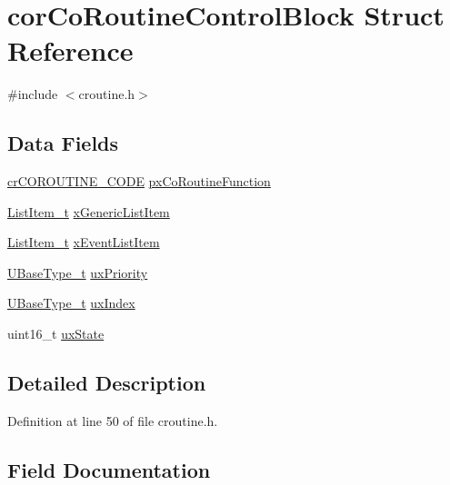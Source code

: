 \hypertarget{structcor_co_routine_control_block}{}\section{cor\+Co\+Routine\+Control\+Block Struct Reference}
\label{structcor_co_routine_control_block}


{\ttfamily \#include $<$croutine.\+h$>$}

\subsection*{Data Fields}
\begin{DoxyCompactItemize}
\item 
\hyperlink{croutine_8h_a397a7505718dd366d8411ce324c49758}{cr\+C\+O\+R\+O\+U\+T\+I\+N\+E\+\_\+\+C\+O\+DE} \hyperlink{structcor_co_routine_control_block_acc98c7364cd88e8e034a5f9bba113832}{px\+Co\+Routine\+Function}
\item 
\hyperlink{list_8h_a1a62d469392f9bfe2443e7efab9c8398}{List\+Item\+\_\+t} \hyperlink{structcor_co_routine_control_block_aa2900494db8782eeb8ef12d482501406}{x\+Generic\+List\+Item}
\item 
\hyperlink{list_8h_a1a62d469392f9bfe2443e7efab9c8398}{List\+Item\+\_\+t} \hyperlink{structcor_co_routine_control_block_a105d316da0069f766acc3b210afed1b9}{x\+Event\+List\+Item}
\item 
\hyperlink{portmacro_8h_a646f89d4298e4f5afd522202b11cb2e6}{U\+Base\+Type\+\_\+t} \hyperlink{structcor_co_routine_control_block_a752101a5d41b5caa7fd5149436613c8f}{ux\+Priority}
\item 
\hyperlink{portmacro_8h_a646f89d4298e4f5afd522202b11cb2e6}{U\+Base\+Type\+\_\+t} \hyperlink{structcor_co_routine_control_block_a6c185cd2145f562fb570bea9b158fc81}{ux\+Index}
\item 
uint16\+\_\+t \hyperlink{structcor_co_routine_control_block_aa0d702ff5a23c61598fe13e5a78fb1dc}{ux\+State}
\end{DoxyCompactItemize}


\subsection{Detailed Description}


Definition at line 50 of file croutine.\+h.



\subsection{Field Documentation}
\mbox{\label{structcor_co_routine_control_block_acc98c7364cd88e8e034a5f9bba113832}} 
